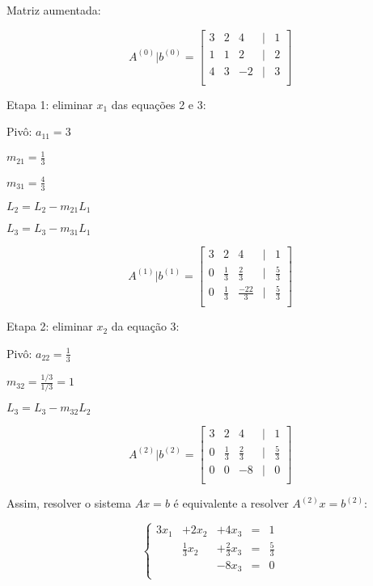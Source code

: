 \documentclass[a4paper]{article}
\begin{document}
Matriz aumentada:

\begin{displaymath}
  A^{(0)}|b^{(0)} = \begin{bmatrix}
    3 & 2 & 4 &|& 1\\
    1 & 1 & 2 &|& 2\\
    4 & 3 & -2 &|& 3\\
  \end{bmatrix}
\end{displaymath}

Etapa 1: eliminar $x_1$ das equações 2 e 3:

Pivô: $a_{11}=3$

$m_{21} = \frac{1}{3}$

$m_{31} = \frac{4}{3}$

$L_2 = L_2 - m_{21}L_1$

$L_3 = L_3 - m_{31}L_1$

\begin{displaymath}
  A^{(1)}|b^{(1)} = \begin{bmatrix}
    3 & 2 & 4 &|& 1\\
    0 & \frac{1}{3} & \frac{2}{3} &|& \frac{5}{3}\\
    0 & \frac{1}{3} & \frac{-22}{3} &|& \frac{5}{3}\\
  \end{bmatrix}
\end{displaymath}


Etapa 2: eliminar $x_2$ da equação 3:

Pivô: $a_{22} = \frac{1}{3}$

$m_{32} = \frac{1/3}{1/3} = 1$

$L_3 = L_3 - m_{32}L_2$

\begin{displaymath}
  A^{(2)}|b^{(2)} = \begin{bmatrix}
    3 & 2 & 4 &|& 1\\
    0 & \frac{1}{3} & \frac{2}{3} &|& \frac{5}{3}\\
    0 & 0 & -8 &|& 0\\
  \end{bmatrix}
\end{displaymath}

Assim, resolver o sistema $Ax=b$ é equivalente a resolver
$A^{(2)}x=b^{(2)}$:

\begin{displaymath}
  \left\{
  \begin{array}{ccccc}
    3x_1 &+ 2x_2 &+ 4x_3 &=&1\\
     & \frac{1}{3} x_2 &+ \frac{2}{3}x_3 &=& \frac{5}{3}\\
     & &- 8x_3 &=& 0\\
  \end{array}
\right.
\end{displaymath}
\end{document}
